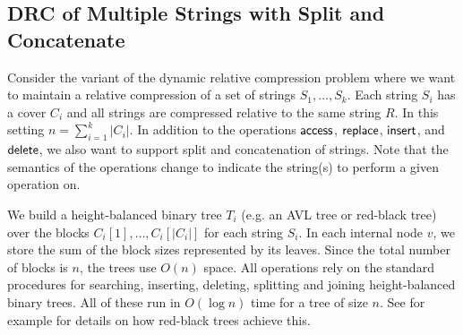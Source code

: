 


\subsection{DRC of Multiple Strings with Split and Concatenate}
Consider the variant of the dynamic relative compression problem where we want to maintain a relative compression of a set of strings $S_1,\ldots,S_k$. Each string $S_i$ has a cover $C_i$ and all strings are compressed relative to the same string $R$. In this setting $n=\sum_{i=1}^k |C_i|$. In addition to the operations $\mathsf{access}$, $\mathsf{replace}$, $\mathsf{insert}$, and $\mathsf{delete}$, we also want to support split and concatenation of strings. Note that the semantics of the operations change to indicate the string(s) to perform a given operation on. 

We build a height-balanced binary tree $T_i$ (e.g. an AVL tree or red-black tree) over the blocks $C_i[1],\ldots,C_i[|C_i|]$ for each string $S_i$. In each internal node $v$, we store the sum of the block sizes represented by its leaves. Since the total number of blocks is $n$, the trees use $O(n)$ space. All operations rely on the standard procedures for searching, inserting, deleting, splitting and joining height-balanced binary trees. All of these run in $O(\log n)$ time for a tree of size $n$. See for example \cite{CLRS2001} for details on how red-black trees achieve this.

